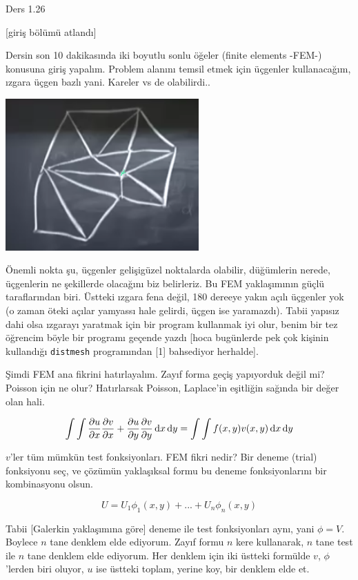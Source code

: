 \documentclass[12pt,fleqn]{article}\usepackage{../../common}
\begin{document}
Ders 1.26

[giriş bölümü atlandı]

Dersin son 10 dakikasında iki boyutlu sonlu öğeler (finite elements -FEM-)
konusuna giriş yapalım. Problem alanını temsil etmek için üçgenler kullanacağım,
ızgara üçgen bazlı yani. Kareler vs de olabilirdi..

\includegraphics[width=20em]{compscieng_1_26_01.png}

Önemli nokta şu, üçgenler gelişigüzel noktalarda olabilir, düğümlerin nerede,
üçgenlerin ne şekillerde olacağını biz belirleriz. Bu FEM yaklaşımının güçlü
taraflarından biri. Üstteki ızgara fena değil, 180 dereeye yakın açılı üçgenler
yok (o zaman öteki açılar yamyassı hale gelirdi, üçgen ise yaramazdı). Tabii
yapısız dahi olsa ızgarayı yaratmak için bir program kullanmak iyi olur, benim
bir tez öğrencim böyle bir programı geçende yazdı [hoca bugünlerde pek çok
  kişinin kullandığı \verb!distmesh! programından [1] bahsediyor herhalde].

Şimdi FEM ana fikrini hatırlayalım. Zayıf forma geçiş yapıyorduk değil mi?
Poisson için ne olur? Hatırlarsak Poisson, Laplace'in eşitliğin sağında bir
değer olan hali.

$$
\int \int
\frac{\partial u}{\partial x} \frac{\partial v}{\partial x} +
\frac{\partial u}{\partial y} \frac{\partial v}{\partial y}
\,\mathrm{d} x \,\mathrm{d} y =
\int \int f(x,y) v(x,y) \,\mathrm{d} x \,\mathrm{d} y 
$$

$v$'ler tüm mümkün test fonksiyonları. FEM fikri nedir? Bir deneme (trial)
fonksiyonu seç, ve çözümün yaklaşıksal formu bu deneme fonksiyonlarını bir
kombinasyonu olsun.

$$
U = U_1 \phi_1(x,y) + ... + U_n \phi_n(x,y) 
$$

Tabii [Galerkin yaklaşımına göre] deneme ile test fonksiyonları aynı, yani
$\phi = V$. Boylece $n$ tane denklem elde ediyorum. Zayıf formu $n$ kere kullanarak,
$n$ tane test ile $n$ tane denklem elde ediyorum. Her denklem için iki üstteki
formülde $v$, $\phi$'lerden biri oluyor, $u$ ise üstteki toplam, yerine koy,
bir denklem elde et.
\end{document}
